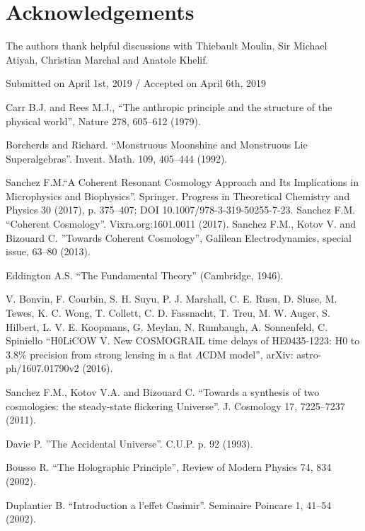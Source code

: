 \documentclass[twoside,draft]{article}
\begin{document}
\begin{sloppypar}
\section*{Acknowledgements}
The authors thank helpful discussions with Thiebault Moulin, Sir Michael Atiyah, Christian Marchal and Anatole Khelif. 
%
\begin{flushright}\footnotesize
Submitted on April 1st, 2019 / Accepted on April 6th, 2019
\end{flushright}


\begin{thebibliography}{99}\footnotesize

 Carr B.J. and Rees M.J., ``The anthropic principle and the
structure of the physical world'', Nature 278, 605--612 (1979).

 Borcherds and Richard. ``Monstruous Moonshine and Monstruous Lie
Superalgebras''. Invent. Math. 109, 405--444 (1992).

 Sanchez F.M.``A Coherent Resonant Cosmology Approach and Its Implications in Microphysics and Biophysics''. Springer. Progress in Theoretical Chemistry and Physics 30 (2017), p. 375--407; DOI 10.1007/978-3-319-50255-7-23.  Sanchez F.M. ``Coherent Cosmology''. Vixra.org:1601.0011 (2017). Sanchez F.M., Kotov V. and Bizouard C. ''Towards Coherent Cosmology'', Galilean Electrodynamics, special issue, 63--80 (2013).

 Eddington A.S. ``The Fundamental Theory'' (Cambridge, 1946).

 V. Bonvin, F. Courbin, S. H. Suyu, P. J. Marshall, C. E. Rusu, D. Sluse, M. Tewes, K. C. Wong, T. Collett, C. D. Fassnacht, T. Treu, M. W. Auger, S. Hilbert, L. V. E. Koopmans, G. Meylan, N. Rumbaugh, A. Sonnenfeld, C. Spiniello ``H0LiCOW V. New COSMOGRAIL time delays of HE0435-1223: H0 to 3.8\% precision from strong lensing in a flat $\Lambda$CDM model'', arXiv: astro-ph/1607.01790v2 (2016).

 Sanchez F.M., Kotov V.A. and Bizouard C. ``Towards a synthesis of
two cosmologies: the steady-state flickering Universe''. J. Cosmology 17,
7225--7237 (2011).

 Davie P. ''The Accidental Universe''. C.U.P. p. 92 (1993).

 Bousso R. ``The Holographic Principle'', Review of Modern Physics
74, 834 (2002).

 Duplantier B. ``Introduction a l'effet Casimir''. Seminaire
Poincare 1, 41--54 (2002).


\end{thebibliography}
\end{sloppypar}
\end{document}
